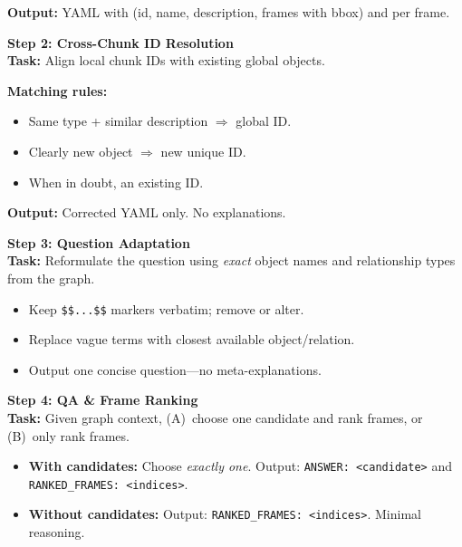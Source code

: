 \begin{promptcard}
\textcolor{promptteal}{\textbf{Output:}} YAML with  (id, name, description, frames with bbox) and  per frame.

\medskip
\textcolor{promptblue}{\textbf{\normalsize Step 2: Cross-Chunk ID Resolution}}\\[2pt]
\textbf{Task:} Align local chunk IDs with existing global objects.

\textcolor{promptteal}{\textbf{Matching rules:}}
\begin{itemize}[nosep, leftmargin=1.2em, label=\textcolor{promptteal}{$\bullet$}]
  \item Same type + similar description $\Rightarrow$  global ID.
  \item Clearly new object $\Rightarrow$ new unique ID.
  \item When in doubt,  an existing ID.
\end{itemize}
\textbf{Output:} Corrected YAML only. No explanations.

\medskip
\textcolor{promptblue}{\textbf{\normalsize Step 3: Question Adaptation}}\\[2pt]
\textbf{Task:} Reformulate the question using \emph{exact} object names and relationship types from the graph.

\begin{itemize}[nosep, leftmargin=1.2em, label=\textcolor{promptteal}{$\bullet$}]
  \item Keep \texttt{\$\$...\$\$} markers verbatim;  remove or alter.
  \item Replace vague terms with closest available object/relation.
  \item Output one concise question---no meta-explanations.
\end{itemize}

\medskip
\textcolor{promptblue}{\textbf{\normalsize Step 4: QA \& Frame Ranking}}\\[2pt]
\textbf{Task:} Given graph context, (A)~choose one candidate and rank frames, or (B)~only rank frames.

\begin{itemize}[nosep, leftmargin=1.2em, label=\textcolor{promptteal}{$\bullet$}]
  \item \textbf{With candidates:} Choose \emph{exactly one}. Output: \texttt{ANSWER: <candidate>} and \texttt{RANKED\_FRAMES: <indices>}.
  \item \textbf{Without candidates:} Output: \texttt{RANKED\_FRAMES: <indices>}. Minimal reasoning.
\end{itemize}


\end{promptcard}
